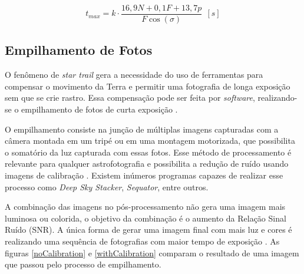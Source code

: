 \begin{equation}
	t_{max} = k \cdot \dfrac{16,9 N  + 0,1 F + 13,7 p}{F\cos(\sigma)}~~[s]
	\label{eq:npf}
\end{equation}

\subsection{Empilhamento de Fotos}

O fenômeno de \textit{star trail} gera a necessidade do uso de ferramentas para compensar o movimento da Terra e permitir uma fotografia de longa exposição sem que se crie rastro. Essa compensação pode ser feita por \textit{software}, realizando-se o empilhamento de fotos de curta exposição \cite{livro:astropratica}.

O empilhamento consiste na junção de múltiplas imagens capturadas com a câmera montada em um tripé ou em uma montagem motorizada, que possibilita o somatório da luz capturada com essas fotos. Esse método de processamento é relevante para qualquer astrofotografia e possibilita a redução de ruído usando imagens de calibração \cite{book:bbcsky}. Existem inúmeros programas capazes de realizar esse processo como \textit{Deep Sky Stacker}, \textit{Sequator}, entre outros.

A combinação das imagens no pós-processamento não gera uma imagem mais luminosa ou colorida, o objetivo da combinação é o aumento da Relação Sinal Ruído (SNR). A única forma de gerar uma imagem final com mais luz e cores é realizando uma sequência de fotografias com maior tempo de exposição \cite{man:deepskystackerBetterImages}. As figuras \ref{noCalibration} e \ref{withCalibration} comparam o resultado de uma imagem que passou pelo processo de empilhamento. 

